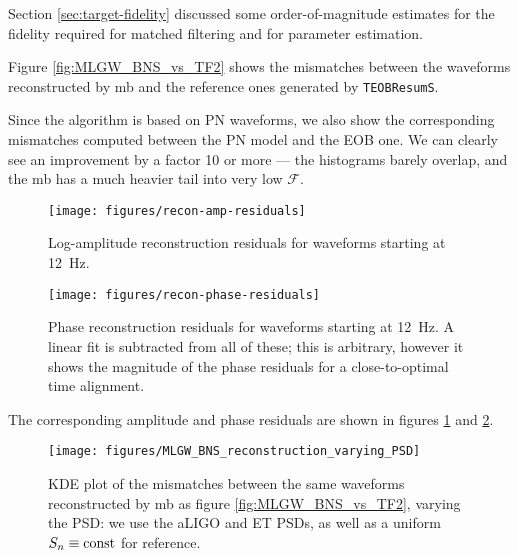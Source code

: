 \documentclass[main.tex]{subfiles}
\begin{document}
Section \ref{sec:target-fidelity} discussed some order-of-magnitude estimates for the fidelity required for matched filtering and for parameter estimation. 

Figure \ref{fig:MLGW_BNS_vs_TF2} shows the mismatches between the waveforms reconstructed by \ac{mb} and the reference ones generated by \texttt{TEOBResumS}. 

Since the algorithm is based on \ac{PN} waveforms, we also show the corresponding mismatches computed between the \ac{PN} model and the \ac{EOB} one. 
We can clearly see an improvement by a factor 10 or more --- the histograms barely overlap, and the \ac{mb} has a much heavier tail into very low \(\mathcal{F}\). 

\begin{figure}[ht]
\centering
\texttt{[image: figures/recon-amp-residuals]}
\caption{Log-amplitude reconstruction residuals for waveforms starting at \SI{12}{Hz}. }
\label{fig:recon-amp-residuals}
\end{figure}

\begin{figure}[ht]
\centering
\texttt{[image: figures/recon-phase-residuals]}
\caption{Phase reconstruction residuals for waveforms starting at \SI{12}{Hz}. A linear fit is subtracted from all of these; this is arbitrary, however it shows the magnitude of the phase residuals for a close-to-optimal time alignment.}
\label{fig:recon-phase-residuals}
\end{figure}

The corresponding amplitude and phase residuals are shown in figures \ref{fig:recon-amp-residuals} and \ref{fig:recon-phase-residuals}. 

\begin{figure}[ht]
\centering
\texttt{[image: figures/MLGW\_BNS\_reconstruction\_varying\_PSD]}
\caption{\ac{KDE} plot of the mismatches between the same waveforms reconstructed by \ac{mb} as figure \ref{fig:MLGW_BNS_vs_TF2}, varying the \ac{PSD}: we use the \ac{aLIGO} and \ac{ET} \acp{PSD}, as well as a uniform \(S_n \equiv \mathrm{const}\) for reference. }
\label{fig:MLGW_BNS_reconstruction_varying_PSD}
\end{figure}

\end{document}
